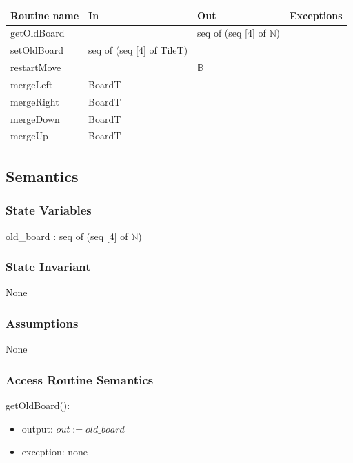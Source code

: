 \documentclass[12pt]{article}
\begin{document}
\begin{tabular}{| l | l | l | p{5cm} |}
  \hline
  \textbf{Routine name} & \textbf{In} & \textbf{Out} & \textbf{Exceptions}\\
  \hline
  getOldBoard & & seq of (seq [4] of $\mathbb{N}$) & \\
  \hline
  setOldBoard & seq of (seq [4] of TileT) & & \\
  \hline
  restartMove & & $\mathbb{B}$ & \\
  \hline
  mergeLeft & BoardT  & & \\
  \hline
  mergeRight & BoardT & & ~\\
  \hline
  mergeDown & BoardT  & & ~\\
  \hline
  mergeUp & BoardT & & ~\\
  \hline
  
\end{tabular}

\subsection* {Semantics}

\subsubsection* {State Variables}

old\_board : seq of (seq [4] of $\mathbb{N}$)

\subsubsection* {State Invariant}

None

\subsubsection* {Assumptions}

None

\subsubsection* {Access Routine Semantics}


\noindent getOldBoard():
\begin{itemize}
\item output: $out := old\_board$
\item exception: none
\end{itemize}
\end{document}
